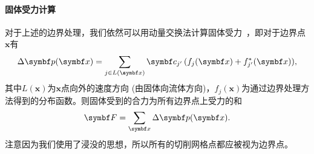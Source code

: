 \paragraph{固体受力计算}
对于上述的边界处理，我们依然可以用动量交换法计算固体受力~\cite{Ladd-1994, Mei-2002}，即对于边界点$\bm{x}$有
\begin{equation}
    \Delta \bm{p}(\bm{x})= \sum_{j\in L(\bm{x})} \bm{c}_{j'}\,(f_{j}(\bm{x}) + f^*_{j'}(\bm{x})),\vspace*{-1.5mm}
\end{equation}
其中$L(\bm{x})$为$\bm{x}$点向外的速度方向 (由固体向流体方向)，$f_{j}(\bm{x})$为通过边界处理方法得到的分布函数。则固体受到的合力为所有边界点上受力的和
\begin{equation}
    \bm{F} = \sum_{\bm{x}} \Delta \bm{p}(\bm{x}).\vspace*{-1mm}
\end{equation}
注意因为我们使用了浸没的思想，所以所有的切削网格点都应被视为边界点。


